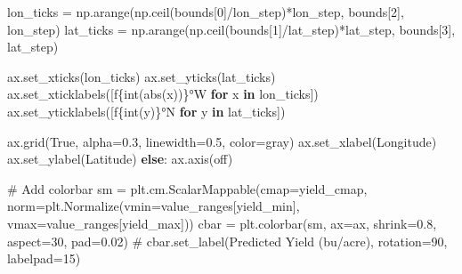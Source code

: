 \documentclass[
  letterpaper,
  DIV=11,
  numbers=noendperiod]{scrreprt}
\newenvironment{Shaded}{\begin{snugshade}}{\end{snugshade}}
\newcommand{\BuiltInTok}[1]{\textcolor[rgb]{0.00,0.23,0.31}{#1}}
\newcommand{\CommentTok}[1]{\textcolor[rgb]{0.37,0.37,0.37}{#1}}
\newcommand{\ControlFlowTok}[1]{\textcolor[rgb]{0.00,0.23,0.31}{\textbf{#1}}}
\newcommand{\DecValTok}[1]{\textcolor[rgb]{0.68,0.00,0.00}{#1}}
\newcommand{\FloatTok}[1]{\textcolor[rgb]{0.68,0.00,0.00}{#1}}
\newcommand{\KeywordTok}[1]{\textcolor[rgb]{0.00,0.23,0.31}{\textbf{#1}}}
\newcommand{\NormalTok}[1]{\textcolor[rgb]{0.00,0.23,0.31}{#1}}
\newcommand{\OperatorTok}[1]{\textcolor[rgb]{0.37,0.37,0.37}{#1}}
\newcommand{\SpecialCharTok}[1]{\textcolor[rgb]{0.37,0.37,0.37}{#1}}
\newcommand{\SpecialStringTok}[1]{\textcolor[rgb]{0.13,0.47,0.30}{#1}}
\newcommand{\StringTok}[1]{\textcolor[rgb]{0.13,0.47,0.30}{#1}}
\newcommand{\VariableTok}[1]{\textcolor[rgb]{0.07,0.07,0.07}{#1}}
\begin{document}
\begin{Shaded}
\begin{Highlighting}[]
\NormalTok{        lon\_ticks }\OperatorTok{=}\NormalTok{ np.arange(np.ceil(bounds[}\DecValTok{0}\NormalTok{]}\OperatorTok{/}\NormalTok{lon\_step)}\OperatorTok{*}\NormalTok{lon\_step, bounds[}\DecValTok{2}\NormalTok{], lon\_step)}
\NormalTok{        lat\_ticks }\OperatorTok{=}\NormalTok{ np.arange(np.ceil(bounds[}\DecValTok{1}\NormalTok{]}\OperatorTok{/}\NormalTok{lat\_step)}\OperatorTok{*}\NormalTok{lat\_step, bounds[}\DecValTok{3}\NormalTok{], lat\_step)}

\NormalTok{        ax.set\_xticks(lon\_ticks)}
\NormalTok{        ax.set\_yticks(lat\_ticks)}
\NormalTok{        ax.set\_xticklabels([}\SpecialStringTok{f\textquotesingle{}}\SpecialCharTok{\{}\BuiltInTok{int}\NormalTok{(}\BuiltInTok{abs}\NormalTok{(x))}\SpecialCharTok{\}}\SpecialStringTok{°W\textquotesingle{}} \ControlFlowTok{for}\NormalTok{ x }\KeywordTok{in}\NormalTok{ lon\_ticks])}
\NormalTok{        ax.set\_yticklabels([}\SpecialStringTok{f\textquotesingle{}}\SpecialCharTok{\{}\BuiltInTok{int}\NormalTok{(y)}\SpecialCharTok{\}}\SpecialStringTok{°N\textquotesingle{}} \ControlFlowTok{for}\NormalTok{ y }\KeywordTok{in}\NormalTok{ lat\_ticks])}

\NormalTok{        ax.grid(}\VariableTok{True}\NormalTok{, alpha}\OperatorTok{=}\FloatTok{0.3}\NormalTok{, linewidth}\OperatorTok{=}\FloatTok{0.5}\NormalTok{, color}\OperatorTok{=}\StringTok{\textquotesingle{}gray\textquotesingle{}}\NormalTok{)}
\NormalTok{        ax.set\_xlabel(}\StringTok{\textquotesingle{}Longitude\textquotesingle{}}\NormalTok{)}
\NormalTok{        ax.set\_ylabel(}\StringTok{\textquotesingle{}Latitude\textquotesingle{}}\NormalTok{)}
    \ControlFlowTok{else}\NormalTok{:}
\NormalTok{        ax.axis(}\StringTok{\textquotesingle{}off\textquotesingle{}}\NormalTok{)}

    \CommentTok{\# Add colorbar}
\NormalTok{    sm }\OperatorTok{=}\NormalTok{ plt.cm.ScalarMappable(cmap}\OperatorTok{=}\NormalTok{yield\_cmap,}
\NormalTok{                              norm}\OperatorTok{=}\NormalTok{plt.Normalize(vmin}\OperatorTok{=}\NormalTok{value\_ranges[}\StringTok{\textquotesingle{}yield\_min\textquotesingle{}}\NormalTok{],}
\NormalTok{                                               vmax}\OperatorTok{=}\NormalTok{value\_ranges[}\StringTok{\textquotesingle{}yield\_max\textquotesingle{}}\NormalTok{]))}
\NormalTok{    cbar }\OperatorTok{=}\NormalTok{ plt.colorbar(sm, ax}\OperatorTok{=}\NormalTok{ax, shrink}\OperatorTok{=}\FloatTok{0.8}\NormalTok{, aspect}\OperatorTok{=}\DecValTok{30}\NormalTok{, pad}\OperatorTok{=}\FloatTok{0.02}\NormalTok{)}
    \CommentTok{\# cbar.set\_label(\textquotesingle{}Predicted Yield (bu/acre)\textquotesingle{}, rotation=90, labelpad=15)}


\end{Highlighting}
\end{Shaded}
\end{document}
